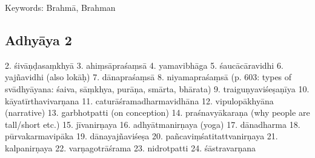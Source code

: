  Keywords: Brahmā, Brahman
%

 
\subsection{Adhyāya 2}\label{contents_of_ch02}
  2. śivāṇḍasaṃkhyā 
  3. ahiṃsāpraśaṃsā 
  4. yamavibhāga
  5. śaucācāravidhi
  6. yajñavidhi (also lokāḥ)
  7. dānapraśaṃsā 
  8. niyamapraśaṃsā (p. 603: types of svādhyāyana: śaiva, sāṃkhya, purāṇa,
                    smārta, bhārata)
  9. traiguṇyaviśeṣaṇīya
  10. kāyatīrthavivarṇana
  11. caturāśramadharmavidhāna 
  12. vipulopākhyāna  (narrative)
  13. garbhotpatti (on conception)
  14. praśnavyākaraṇa (why people are tall/short etc.)
  15. jīvanirṇaya 
  16. adhyātmanirṇaya (yoga) 
  17. dānadharma
  18. pūrvakarmavipāka
  19. dānayajñaviśeṣa
  20. pañcaviṃśatitattvanirṇaya
  21. kalpanirṇaya
  22. varṇagotrāśrama
  23. nidrotpatti
  24. śāstravarṇana

